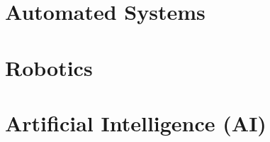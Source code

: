 \documentclass[../main.tex]{subfiles}
\begin{document}
\section{Automated Systems}


\section{Robotics}


\section{Artificial Intelligence (AI)}

\end{document}
